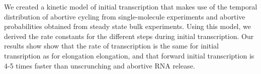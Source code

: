 We created a kinetic model of initial transcription that makes use of the
temporal distribution of abortive cycling from single-molecule experiments and
abortive probabilities obtained from steady state bulk experiments. Using this
model, we derived the rate constants for the different steps during initial
transcription. Our results show show that the rate of transcription is the
same for initial transription as for elongation elongation, and that forward
initial transcription is 4-5 times faster than unscrunching and abortive RNA
release.






